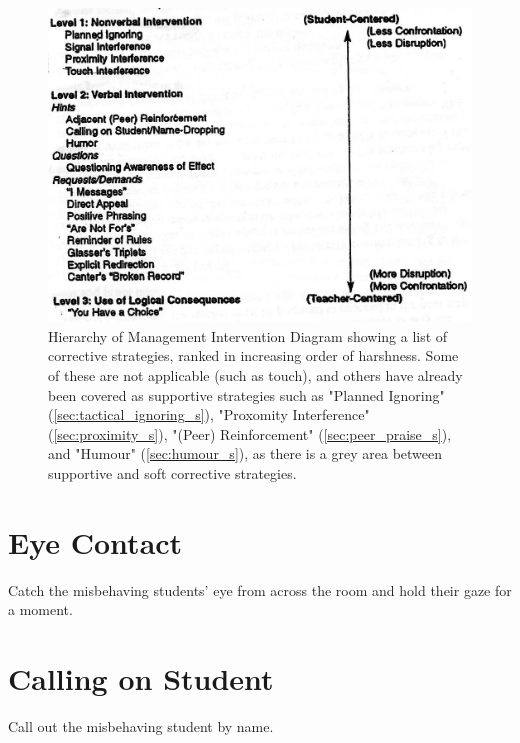 \documentclass[12pt]{report}
\begin{document}
\begin{figure}[p]
\begin{center}
\includegraphics{./images/correctiveHierarchy.jpg}
\end{center}
\caption{Hierarchy of Management Intervention Diagram \cite{Levin2005} showing a list of corrective strategies, ranked in increasing order of harshness. Some of these are not applicable (such as touch), and others have already been covered as supportive strategies such as "Planned Ignoring" (\ref{sec:tactical_ignoring_s}), "Proxomity Interference" (\ref{sec:proximity_s}), "(Peer) Reinforcement" (\ref{sec:peer_praise_s}), and "Humour" (\ref{sec:humour_s}), as there is a grey area between supportive and soft corrective strategies. \label{fig:correctiveHierarchy}}
\end{figure}


\section{Eye Contact}
\label{sec:eye_contact_c}

Catch the misbehaving students' eye from across the room and hold their gaze for a moment\footnotemark. 



\section{Calling on Student}
\label{sec:use_names_c}

Call out the misbehaving student by name\footnotemark[\value{footnote}].
\end{document}
